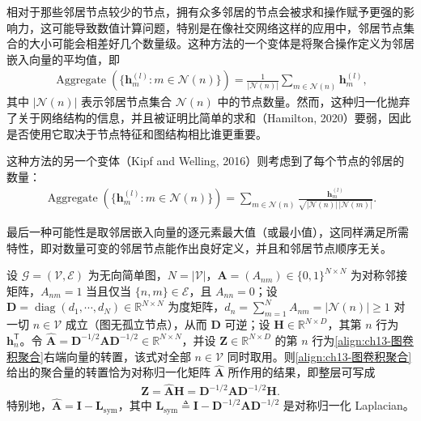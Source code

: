 \documentclass[../../main.tex]{subfiles}
\begin{document}
相对于那些邻居节点较少的节点，拥有众多邻居的节点会被求和操作赋予更强的影响力，这可能导致数值计算问题，特别是在像社交网络这样的应用中，邻居节点集合的大小可能会相差好几个数量级。这种方法的一个变体是将聚合操作定义为邻居嵌入向量的平均值，即
\begin{align}
\operatorname{Aggregate}\!\left(\{\bm{h}_m^{(l)}:m\in\mathcal{N}(n)\}\right)=\frac{1}{|\mathcal{N}(n)|}\sum_{m\in\mathcal{N}(n)}\bm{h}_m^{(l)},
\label{align:ch13-平均聚合}
\end{align}
其中 $|\mathcal{N}(n)|$ 表示邻居节点集合 $\mathcal{N}(n)$ 中的节点数量。然而，这种归一化抛弃了关于网络结构的信息，并且被证明比简单的求和（Hamilton, 2020）要弱，因此是否使用它取决于节点特征和图结构相比谁更重要。

这种方法的另一个变体（Kipf and Welling, 2016）则考虑到了每个节点的邻居的数量：
\begin{align}
\operatorname{Aggregate}\!\left(\{\bm{h}_m^{(l)}:m\in\mathcal{N}(n)\}\right)=\sum_{m\in\mathcal{N}(n)}\frac{\bm{h}_m^{(l)}}{\sqrt{|\mathcal{N}(n)|\,|\mathcal{N}(m)|}}.
\label{align:ch13-图卷积聚合}
\end{align}

最后一种可能性是取邻居嵌入向量的逐元素最大值（或最小值），这同样满足所需特性，即对数量可变的邻居节点能作出良好定义，并且和邻居节点顺序无关。

\begin{proposition}[图卷积聚合的谱解释]\label{proposition:ch13-图卷积谱解释}
设 $\mathcal{G}=(\mathcal{V},\mathcal{E})$ 为无向简单图，$N=|\mathcal{V}|$，$\bm{A}=(A_{nm})\in\{0,1\}^{N\times N}$ 为对称邻接矩阵，$A_{nm}=1$ 当且仅当 $\{n,m\}\in\mathcal{E}$，且 $A_{nn}=0$；设 $\bm{D}=\operatorname{diag}(d_1,\cdots,d_N)\in\mathbb{R}^{N\times N}$ 为度矩阵，$d_n=\sum_{m=1}^{N}A_{nm}=|\mathcal{N}(n)|\geqslant1$ 对一切 $n\in\mathcal{V}$ 成立（图无孤立节点），从而 $\bm{D}$ 可逆；设 $\bm{H}\in\mathbb{R}^{N\times D}$，其第 $n$ 行为 $\bm{h}_n^{\mathsf T}$。令 $\widehat{\bm{A}}=\bm{D}^{-1/2}\bm{A}\bm{D}^{-1/2}\in\mathbb{R}^{N\times N}$，并设 $\bm{Z}\in\mathbb{R}^{N\times D}$ 的第 $n$ 行为\eqref{align:ch13-图卷积聚合}右端向量的转置，该式对全部 $n\in\mathcal{V}$ 同时取用。则\eqref{align:ch13-图卷积聚合}给出的聚合量的转置恰为对称归一化矩阵 $\widehat{\bm{A}}$ 所作用的结果，即整层可写成
\begin{align*}
\bm{Z}=\widehat{\bm{A}}\bm{H}=\bm{D}^{-1/2}\bm{A}\bm{D}^{-1/2}\bm{H}.
\end{align*}
特别地，$\widehat{\bm{A}}=\bm{I}-\bm{L}_{\mathrm{sym}}$，其中 $\bm{L}_{\mathrm{sym}}\triangleq\bm{I}-\bm{D}^{-1/2}\bm{A}\bm{D}^{-1/2}$ 是对称归一化 Laplacian。
\end{proposition}
\end{document}
